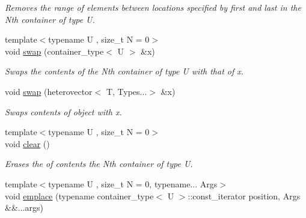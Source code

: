 \begin{DoxyCompactItemize}
\begin{DoxyCompactList}\small\item\em Removes the range of elements between locations specified by first and last in the Nth container of type U. \end{DoxyCompactList}\item 
\hypertarget{classheterogeneous_1_1heterovector_3_01_t_00_01_types_8_8_8_4_a3c74833fc5d69263f3ceb4d4769bac25}{}{\footnotesize template$<$typename U , size\+\_\+t N = 0$>$ }\\void \hyperlink{classheterogeneous_1_1heterovector_3_01_t_00_01_types_8_8_8_4_a3c74833fc5d69263f3ceb4d4769bac25}{swap} (container\+\_\+type$<$ U $>$ \&x)\label{classheterogeneous_1_1heterovector_3_01_t_00_01_types_8_8_8_4_a3c74833fc5d69263f3ceb4d4769bac25}

\begin{DoxyCompactList}\small\item\em Swaps the contents of the Nth container of type U with that of x. \end{DoxyCompactList}\item 
\hypertarget{classheterogeneous_1_1heterovector_3_01_t_00_01_types_8_8_8_4_accbf8271129ab3152353a22f3723133d}{}void \hyperlink{classheterogeneous_1_1heterovector_3_01_t_00_01_types_8_8_8_4_accbf8271129ab3152353a22f3723133d}{swap} (heterovector$<$ T, Types...$>$ \&x)\label{classheterogeneous_1_1heterovector_3_01_t_00_01_types_8_8_8_4_accbf8271129ab3152353a22f3723133d}

\begin{DoxyCompactList}\small\item\em Swaps contents of object with x. \end{DoxyCompactList}\item 
\hypertarget{classheterogeneous_1_1heterovector_3_01_t_00_01_types_8_8_8_4_ae92822698ced240d0a4fd6f320668818}{}{\footnotesize template$<$typename U , size\+\_\+t N = 0$>$ }\\void \hyperlink{classheterogeneous_1_1heterovector_3_01_t_00_01_types_8_8_8_4_ae92822698ced240d0a4fd6f320668818}{clear} ()\label{classheterogeneous_1_1heterovector_3_01_t_00_01_types_8_8_8_4_ae92822698ced240d0a4fd6f320668818}

\begin{DoxyCompactList}\small\item\em Erases the of contents the Nth container of type U. \end{DoxyCompactList}\item 
\hypertarget{classheterogeneous_1_1heterovector_3_01_t_00_01_types_8_8_8_4_a24086557e653f6f96393663eb5258c86}{}{\footnotesize template$<$typename U , size\+\_\+t N = 0, typename... Args$>$ }\\void \hyperlink{classheterogeneous_1_1heterovector_3_01_t_00_01_types_8_8_8_4_a24086557e653f6f96393663eb5258c86}{emplace} (typename container\+\_\+type$<$ U $>$\+::const\+\_\+iterator position, Args \&\&...args)\label{classheterogeneous_1_1heterovector_3_01_t_00_01_types_8_8_8_4_a24086557e653f6f96393663eb5258c86}


\end{DoxyCompactItemize}
